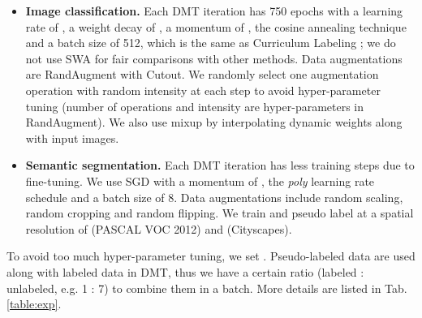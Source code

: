\documentclass[preprint,review,10pt]{elsarticle}
\begin{document}
\begin{itemize}
    \item \textbf{Image classification.} Each DMT iteration has 750 epochs with a learning rate of , a weight decay of , a momentum of , the cosine annealing technique and a batch size of 512, which is the same as Curriculum Labeling \cite{cascante2020curriculum}; we do not use SWA \cite{izmailov2018averaging} for fair comparisons with other methods. Data augmentations are RandAugment \cite{cubuk2020randaugment} with Cutout. We randomly select one augmentation operation with random intensity at each step to avoid hyper-parameter tuning (number of operations  and intensity  are hyper-parameters in RandAugment). We also use mixup \cite{zhang2018mixup} by interpolating dynamic weights along with input images.
    \item \textbf{Semantic segmentation.} Each DMT iteration has less training steps due to fine-tuning. We use SGD with a momentum of , the \emph{poly} learning rate schedule and a batch size of 8. Data augmentations include random scaling, random cropping and random flipping. We train and pseudo label at a spatial resolution of  (PASCAL VOC 2012) and  (Cityscapes).
\end{itemize}

To avoid too much hyper-parameter tuning, we set . Pseudo-labeled data are used along with labeled data in DMT, thus we have a certain ratio (labeled : unlabeled, e.g. 1 : 7) to combine them in a batch. More details are listed in Tab. \ref{table:exp}.
\end{document}
